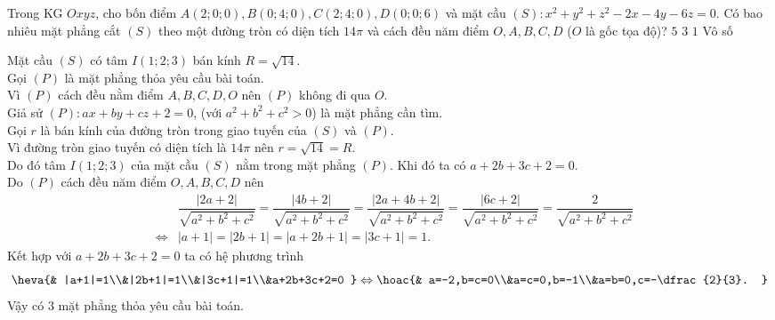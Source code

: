 \begin{ex}%
	Trong KG $Oxyz$, cho bốn điểm $A(2;0;0),B(0;4;0),C(2;4;0),D(0;0;6)$ và mặt cầu $(S)\colon x^2+y^2+z^2-2x-4y-6z=0$. Có bao nhiêu mặt phẳng cắt $(S)$ theo một đường tròn có diện tích $14\pi$ và cách đều năm điểm $O,A,B,C,D$ ($O$ là gốc tọa độ)?
	\choice
	{$5$}
	{\True  $3$}
	{$1$}
	{Vô số}
	\loigiai
	{
		Mặt cầu $(S)$ có tâm $I(1;2;3)$ bán kính $R=\sqrt{14}$.\\
		Gọi $(P)$ là mặt phẳng thỏa yêu cầu bài toán.\\
		Vì $(P)$ cách đều nằm điểm $A,B,C,D,O$ nên $(P)$ không đi qua $O$.\\
		Giả sử $(P)\colon ax+by+cz+2=0$, (với $a^2+b^2+c^2>0$) là mặt phẳng cần tìm.\\
		Gọi $r$ là bán kính của đường tròn trong giao tuyến của $(S)$ và $(P)$.\\
		Vì đường tròn giao tuyến có diện tích là $14\pi $ nên $r=\sqrt{14}=R$.\\
		Do đó tâm $I(1;2;3)$ của mặt cầu $(S)$ nằm trong mặt phẳng $(P)$. Khi đó ta có $a+2b+3c+2=0$.\\
		Do $(P)$ cách đều năm điểm $O,A,B,C,D$ nên
		\begin{eqnarray*}
			&&\dfrac{|2a+2|}{\sqrt{a^2+b^2+c^2}}=\dfrac{|4b+2|}{\sqrt{a^2+b^2+c^2}}=\dfrac{|2a+4b+2|}{\sqrt{a^2+b^2+c^2}}=\dfrac{|6c+2|}{\sqrt{a^2+b^2+c^2}}=\dfrac{2}{\sqrt{a^2+b^2+c^2}}\\
			&\Leftrightarrow &|a+1|=|2b+1|=|a+2b+1|=|3c+1|=1.
		\end{eqnarray*}
		Kết hợp với $a+2b+3c+2=0$ ta có hệ phương trình
		$$\heva{& |a+1|=1\\&|2b+1|=1\\&|3c+1|=1\\&a+2b+3c+2=0 }\Leftrightarrow\hoac{& a=-2,b=c=0\\&a=c=0,b=-1\\&a=b=0,c=-\dfrac{2}{3}. }$$
		Vậy có $3$ mặt phẳng thỏa yêu cầu bài toán.
		
	}
\end{ex}
